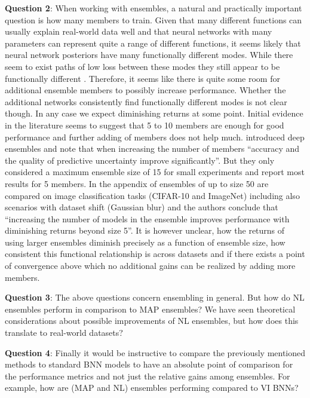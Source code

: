 \documentclass[../thesis.tex]{subfiles}
\begin{document}
\noindent \textbf{Question 2}: When working with ensembles, a natural and practically important question is how many members to train. Given that many different functions can usually explain real-world data well and that neural networks with many parameters can represent quite a range of different functions, it seems likely that neural network posteriors have many functionally different modes. %
While there seem to exist paths of low loss between these modes \parencite{draxler2018essentially} they still appear to be functionally different \parencite{fort2019deep}. Therefore, it seems like there is quite some room for additional ensemble members to possibly increase performance. Whether the additional networks consistently find functionally different modes is not clear though. In any case we expect diminishing returns at some point.
Initial evidence in the literature seems to suggest that 5 to 10 members are enough for good performance and further adding of members does not help much. \textcite{lakshminarayanan2017simple} introduced deep ensembles and note that when increasing the number of members ``accuracy and the quality of predictive uncertainty improve significantly''. But they only considered a maximum ensemble size of 15 for small experiments and report most results for 5 members. In the appendix of \textcite{ovadia2019can} ensembles of up to size 50 are compared on image classification tasks (CIFAR-10 and ImageNet) including also scenarios with dataset shift (Gaussian blur) and the authors conclude that ``increasing the number of models in the ensemble improves performance with diminishing returns beyond size 5''. 
It is however unclear, how the returns of using larger ensembles diminish precisely as a function of ensemble size, how consistent this functional relationship is across datasets and if there exists a point of convergence above which no additional gains can be realized by adding more members. 
\medskip

\noindent \textbf{Question 3}: The above questions concern ensembling in general. But how do NL ensembles perform in comparison to MAP ensembles? We have seen theoretical considerations about possible improvements of NL ensembles, but how does this translate to real-world datasets? 
\medskip

\noindent \textbf{Question 4}: Finally it would be instructive to compare the previously mentioned methods to standard BNN models to have an absolute point of comparison for the performance metrics and not just the relative gains among ensembles. For example, how are (MAP and NL) ensembles performing compared to VI BNNs?
\medskip
\end{document}

